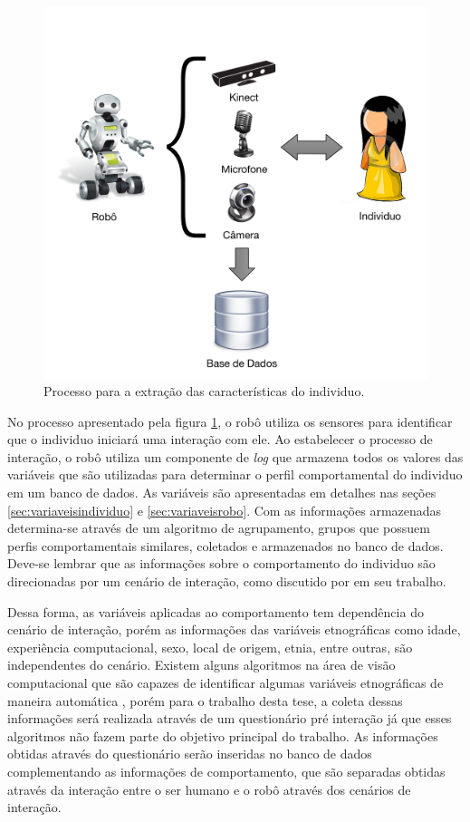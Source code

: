 \begin{figure}[ht!]
	\centering
	\includegraphics[scale=0.6]{images/captura_carac_individuo.png}
	\caption{Processo para a extração das características do individuo.}
	\label{fig:capturacaracteristicas}
\end{figure}

No processo apresentado pela figura \ref{fig:capturacaracteristicas}, o robô utiliza os sensores para identificar que o individuo iniciará uma interação com ele. Ao estabelecer o processo de interação, o robô utiliza um componente de \emph{log} que armazena todos os valores das variáveis que são utilizadas para determinar o perfil comportamental do individuo em um banco de dados. As variáveis são apresentadas em detalhes nas seções \ref{sec:variaveisindividuo} e \ref{sec:variaveisrobo}. Com as informações armazenadas determina-se através de um algoritmo de agrupamento, grupos que possuem perfis comportamentais similares, coletados e armazenados no banco de dados. Deve-se lembrar que as informações sobre o comportamento do individuo são direcionadas por um cenário de interação, como discutido por  em seu trabalho. 

Dessa forma, as variáveis aplicadas ao comportamento tem dependência do cenário de interação, porém as informações das variáveis etnográficas como idade, experiência computacional, sexo, local de origem, etnia, entre outras, são independentes do cenário. Existem alguns algoritmos na área de visão computacional que são capazes de identificar algumas variáveis etnográficas de maneira automática \cite{Yang:2007, Shan:2012, Ylioinas:2012, Samadi:2013, Amaral:2014}, porém para o trabalho desta tese, a coleta dessas informações será realizada através de um questionário pré interação já que esses algoritmos não fazem parte do objetivo principal do trabalho. As informações obtidas através do questionário serão inseridas no banco de dados complementando as informações de comportamento, que são separadas obtidas através da interação entre o ser humano e o robô através dos cenários de interação.


